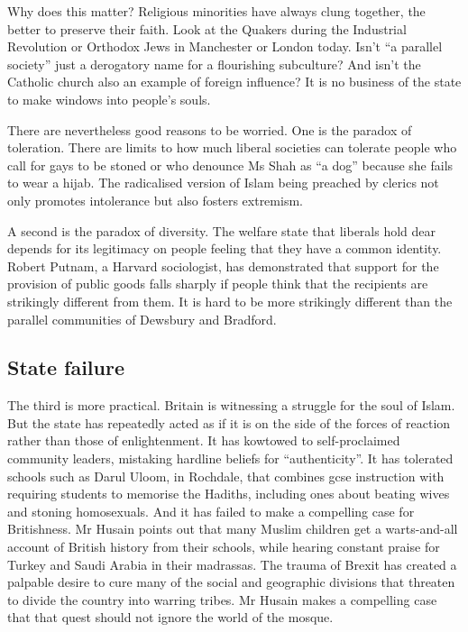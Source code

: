 Why does this matter? Religious minorities have always clung together, the better to preserve their faith. Look at the Quakers during the Industrial Revolution or Orthodox Jews in Manchester or London today. Isn’t “a parallel society” just a derogatory name for a flourishing subculture? And isn’t the Catholic church also an example of foreign influence? It is no business of the state to make windows into people’s souls.

There are nevertheless good reasons to be worried. One is the paradox of toleration. There are limits to how much liberal societies can tolerate people who call for gays to be stoned or who denounce Ms Shah as “a dog” because she fails to wear a hijab. The radicalised version of Islam being preached by clerics not only promotes intolerance but also fosters extremism.

A second is the paradox of diversity. The welfare state that liberals hold dear depends for its legitimacy on people feeling that they have a common identity. Robert Putnam, a Harvard sociologist, has demonstrated that support for the provision of public goods falls sharply if people think that the recipients are strikingly different from them. It is hard to be more strikingly different than the parallel communities of Dewsbury and Bradford.
\subsection{State failure}
The third is more practical. Britain is witnessing a struggle for the soul of Islam. But the state has repeatedly acted as if it is on the side of the forces of reaction rather than those of enlightenment. It has kowtowed to self-proclaimed community leaders, mistaking hardline beliefs for “authenticity”. It has tolerated schools such as Darul Uloom, in Rochdale, that combines gcse instruction with requiring students to memorise the Hadiths, including ones about beating wives and stoning homosexuals. And it has failed to make a compelling case for Britishness. Mr Husain points out that many Muslim children get a warts-and-all account of British history from their schools, while hearing constant praise for Turkey and Saudi Arabia in their madrassas. The trauma of Brexit has created a palpable desire to cure many of the social and geographic divisions that threaten to divide the country into warring tribes. Mr Husain makes a compelling case that that quest should not ignore the world of the mosque. 